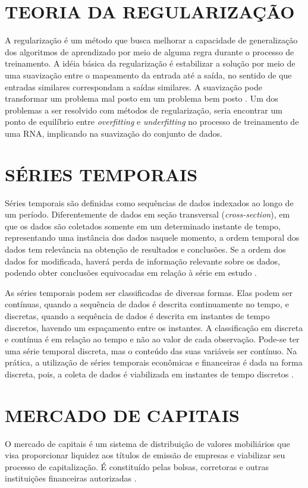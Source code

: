\section{TEORIA DA REGULARIZAÇÃO}\label{regularizacao}
A regularização é um método que busca melhorar a capacidade de generalização dos algoritmos de aprendizado por meio de alguma regra durante o processo de treinamento. A idéia básica da regularização é estabilizar a solução por meio de uma suavização entre o mapeamento da entrada até a saída, no sentido de que entradas similares correspondam a saídas similares. A suavização pode transformar um problema mal posto em um problema bem posto \cite{medeiros}. Um dos problemas a ser resolvido com métodos de regularização, seria encontrar um ponto de equilíbrio entre \textit{overfitting} e \textit{underfitting} no processo de treinamento de uma RNA, implicando na suavização do conjunto de dados.

\section{SÉRIES TEMPORAIS}\label{series-temporais}
Séries temporais são definidas como sequências de dados indexados ao longo de um período. Diferentemente de dados em seção transversal (\textit{cross-section}), em que os dados são coletados somente em um determinado instante de tempo, representando uma instância dos dados naquele momento, a ordem temporal dos dados tem relevância na obtenção de resultados e conclusões. Se a ordem dos dados for modificada, haverá perda de informação relevante sobre os dados, podendo obter conclusões equivocadas em relação à série em estudo \cite{neto}.

As séries temporais podem ser classificadas de diversas formas. Elas podem ser contínuas, quando a sequência de dados é descrita continuamente no tempo, e discretas, quando a sequência de dados é descrita em instantes de tempo discretos, havendo um espaçamento entre os instantes. A classificação em discreta e contínua é em relação ao tempo e não ao valor de cada observação. Pode-se ter uma série temporal discreta, mas o conteúdo das suas variáveis ser contínuo. Na prática, a utilização de séries temporais econômicas e financeiras é dada na forma discreta, pois, a coleta de dados é viabilizada em instantes de tempo discretos \cite{oliveira2012}.

\section{MERCADO DE CAPITAIS}\label{capitais}
O mercado de capitais é um sistema de distribuição de valores mobiliários que visa proporcionar liquidez aos títulos de emissão de empresas e viabilizar seu processo de capitalização. É constituído pelas bolsas, corretoras e outras instituições financeiras autorizadas \cite{tororadar}.

